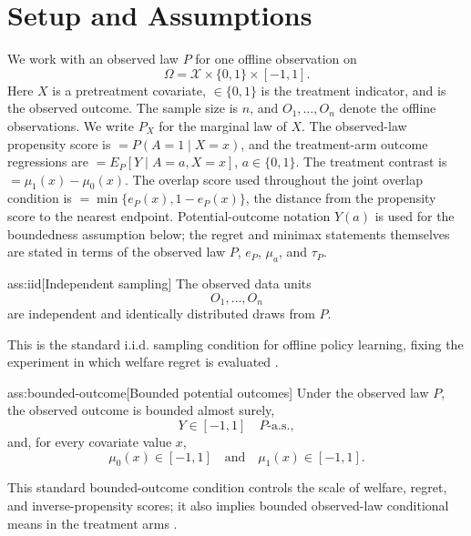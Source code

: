 \section{Setup and Assumptions}

We work with an observed law \(P\) for one offline observation  on
\[
\Omega=\mathcal X\times\{0,1\}\times[-1,1].
\]
Here \(X\) is a pretreatment covariate, \(\in\{0,1\}\) is the treatment indicator, and  is the observed outcome.  The sample size is \(n\), and \(O_1,\ldots,O_n\) denote the offline observations.  We write \(P_X\) for the marginal law of \(X\).  The observed-law propensity score is \(=P(A=1\mid X=x)\), and the treatment-arm outcome regressions are \(=E_P[Y\mid A=a,X=x]\), \(a\in\{0,1\}\).  The treatment contrast is \(=\mu_1(x)-\mu_0(x)\).  The overlap score used throughout the joint overlap condition is \(=\min\{e_P(x),1-e_P(x)\}\), the distance from the propensity score to the nearest endpoint.  Potential-outcome notation \(Y(a)\) is used for the boundedness assumption below; the regret and minimax statements themselves are stated in terms of the observed law \(P\), \(e_P\), \(\mu_a\), and \(\tau_P\).

\begin{assumptionv}{ass:iid}[Independent sampling]
The observed data units
\[
O_1,\ldots,O_n
\]
are independent and identically distributed draws from \(P\).
\end{assumptionv}

This is the standard i.i.d. sampling condition for offline policy learning, fixing the experiment in which welfare regret is evaluated \citep{Athey2021}.

\begin{assumptionv}{ass:bounded-outcome}[Bounded potential outcomes]
Under the observed law \(P\), the observed outcome is bounded almost surely,
\[
Y\in[-1,1]\quad P\text{-a.s.},
\]
and, for every covariate value \(x\),
\[
\mu_0(x)\in[-1,1]\quad\text{and}\quad \mu_1(x)\in[-1,1].
\]
\end{assumptionv}

This standard bounded-outcome condition controls the scale of welfare, regret, and inverse-propensity scores; it also implies bounded observed-law conditional means in the treatment arms \citep{Athey2021}.

